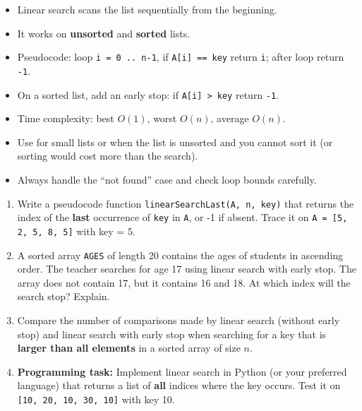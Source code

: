 \documentclass[11pt]{article}
\newcounter{popsec}
\newcounter{popsub}
\newcommand{\courssub}[1]{%
  \stepcounter{popsub}%
  \par\vspace{9pt}\noindent{\popxbold\fontsize{11.5}{13}\selectfont\color{popink}{\color{poporange}\thepopsec.\thepopsub}\hspace{6pt}#1}\par\nopagebreak\vspace{4pt}
}
\begin{document}
\courssub{Summary}

\begin{aretenir}
\begin{itemize}
    \item Linear search scans the list sequentially from the beginning.
    \item It works on \textbf{unsorted} and \textbf{sorted} lists.
    \item Pseudocode: loop \texttt{i = 0 .. n-1}, if \texttt{A[i] == key} return \texttt{i}; after loop return \texttt{-1}.
    \item On a sorted list, add an early stop: if \texttt{A[i] > key} return \texttt{-1}.
    \item Time complexity: best $O(1)$, worst $O(n)$, average $O(n)$.
    \item Use for small lists or when the list is unsorted and you cannot sort it (or sorting would cost more than the search).
    \item Always handle the ``not found'' case and check loop bounds carefully.
\end{itemize}
\end{aretenir}

\begin{exercice}
\begin{enumerate}
    \item Write a pseudocode function \texttt{linearSearchLast(A, n, key)} that returns the index of the \textbf{last} occurrence of \texttt{key} in \texttt{A}, or -1 if absent. Trace it on \texttt{A = [5, 2, 5, 8, 5]} with key = 5.
    \item A sorted array \texttt{AGES} of length 20 contains the ages of students in ascending order. The teacher searches for age 17 using linear search with early stop. The array does not contain 17, but it contains 16 and 18. At which index will the search stop? Explain.
    \item Compare the number of comparisons made by linear search (without early stop) and linear search with early stop when searching for a key that is \textbf{larger than all elements} in a sorted array of size $n$.
    \item \textbf{Programming task:} Implement linear search in Python (or your preferred language) that returns a list of \textbf{all} indices where the key occurs. Test it on \texttt{[10, 20, 10, 30, 10]} with key 10.
\end{enumerate}
\end{exercice}
\end{document}
